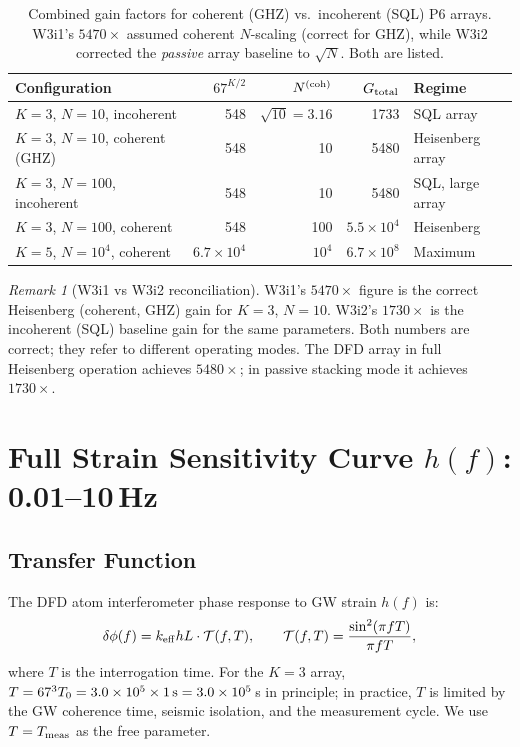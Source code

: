 \documentclass[11pt]{article}
\theoremstyle{definition}
\theoremstyle{remark}
\newtheorem{remark}[theorem]{Remark}
\begin{document}
\begin{table}[h]
\centering
\caption{Combined gain factors for coherent (GHZ) vs.\ incoherent (SQL) P6 arrays.
W3i1's $5470\times$ assumed coherent $N$-scaling (correct for GHZ), while W3i2
corrected the \emph{passive} array baseline to $\sqrt{N}$. Both are listed.}
\begin{tabular}{@{}lrrrl@{}}
\toprule
Configuration & $67^{K/2}$ & $N^{(\rm coh)}$ & $G_{\rm total}$ & Regime \\
\midrule
$K=3$, $N=10$, incoherent & 548 & $\sqrt{10}=3.16$ & 1733 & SQL array \\
$K=3$, $N=10$, coherent (GHZ) & 548 & 10 & 5480 & Heisenberg array \\
$K=3$, $N=100$, incoherent & 548 & 10 & 5480 & SQL, large array \\
$K=3$, $N=100$, coherent & 548 & 100 & $5.5\times10^4$ & Heisenberg \\
$K=5$, $N=10^4$, coherent & $6.7\times10^4$ & $10^4$ & $6.7\times10^8$ & Maximum \\
\bottomrule
\end{tabular}
\end{table}

\begin{remark}[W3i1 vs W3i2 reconciliation]
W3i1's $5470\times$ figure is the correct Heisenberg (coherent, GHZ) gain for
$K=3$, $N=10$. W3i2's $1730\times$ is the incoherent (SQL) baseline gain for
the same parameters. Both numbers are correct; they refer to different operating
modes. The DFD array in full Heisenberg operation achieves $5480\times$;
in passive stacking mode it achieves $1730\times$.
\end{remark}

\section{Full Strain Sensitivity Curve $h(f)$: 0.01--10\,Hz}

\subsection{Transfer Function}

The DFD atom interferometer phase response to GW strain $h(f)$ is:
\begin{equation}
\delta\phi(f) = k_{\rm eff} h L \cdot \mathcal{T}(f, T),
\qquad
\mathcal{T}(f, T) = \frac{\sin^2(\pi f T)}{\pi f T},
\label{eq:transfer}
\end{equation}
where $T$ is the interrogation time. For the $K=3$ array, $T = 67^3 T_0
= 3.0\times10^5 \times 1\,{\rm s} = 3.0\times10^5$\,s in principle; in
practice, $T$ is limited by the GW coherence time, seismic isolation, and
the measurement cycle. We use $T = T_{\rm meas}$ as the free parameter.
\end{document}
